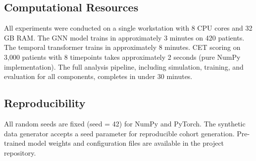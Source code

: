 \documentclass[10pt,a4paper]{article}
\begin{document}
\subsection{Computational Resources}

All experiments were conducted on a single workstation with 8 CPU cores and 32 GB RAM. The GNN model trains in approximately 3 minutes on 420 patients. The temporal transformer trains in approximately 8 minutes. CET scoring on 3,000 patients with 8 timepoints takes approximately 2 seconds (pure NumPy implementation). The full analysis pipeline, including simulation, training, and evaluation for all components, completes in under 30 minutes.

\subsection{Reproducibility}

All random seeds are fixed (seed = 42) for NumPy and PyTorch. The synthetic data generator accepts a seed parameter for reproducible cohort generation. Pre-trained model weights and configuration files are available in the project repository.
\end{document}
